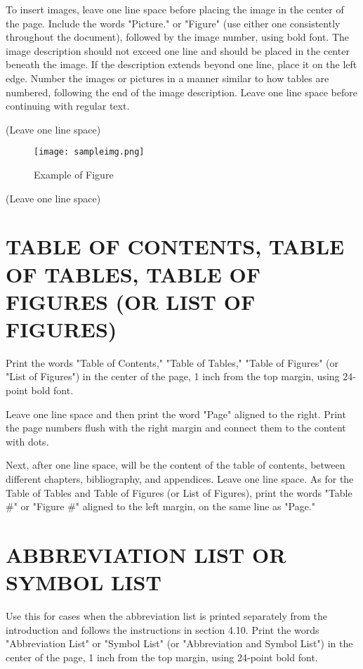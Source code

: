 To insert images, leave one line space before placing the image in the center of the page. Include the words "Picture." or "Figure" (use either one consistently throughout the document), followed by the image number, using bold font. The image description should not exceed one line and should be placed in the center beneath the image. If the description extends beyond one line, place it on the left edge. Number the images or pictures in a manner similar to how tables are numbered, following the end of the image description. Leave one line space before continuing with regular text.

(Leave one line space)

\begin{figure}[h]
\begin{center}
    \texttt{[image: sampleimg.png]}
\end{center}

\caption{Example of Figure}
\label{fig:3.1}
\end{figure}

(Leave one line space)

\section{TABLE OF CONTENTS, TABLE OF TABLES, TABLE OF FIGURES (OR LIST OF FIGURES)}

Print the words "Table of Contents," "Table of Tables," "Table of Figures" (or "List of Figures") in the center of the page, 1 inch from the top margin, using 24-point bold font.

Leave one line space and then print the word "Page" aligned to the right. Print the page numbers flush with the right margin and connect them to the content with dots.

Next, after one line space, will be the content of the table of contents, between different chapters, bibliography, and appendices. Leave one line space. As for the Table of Tables and Table of Figures (or List of Figures), print the words "Table \#" or "Figure \#" aligned to the left margin, on the same line as "Page."

\section{ABBREVIATION LIST OR SYMBOL LIST}

Use this for cases when the abbreviation list is printed separately from the introduction and follows the instructions in section 4.10. Print the words "Abbreviation List" or "Symbol List" (or "Abbreviation and Symbol List") in the center of the page, 1 inch from the top margin, using 24-point bold font.

